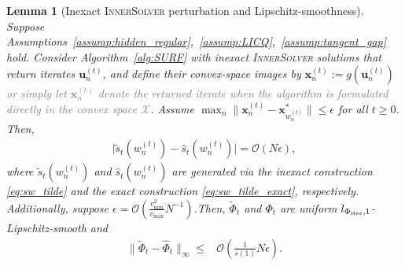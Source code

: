 \documentclass{article}
\newtheorem{lemma}{Lemma}
\newcommand{\Oc}{\mathcal{O}}
\newcommand{\bx}{\mathbf{x}}
\newcommand{\bu}{\mathbf{u}}
\newcommand{\X}{\mathcal{X}}
\newcommand{\Farc}{\Phi}
\begin{document}
\begin{lemma}[Inexact \textsc{InnerSolver} perturbation and Lipschitz-smoothness]
\label{lem:exact_inexact_polyline_sampled_weights_gap}
Suppose Assumptions~\ref{assump:hidden_regular},~\ref{assump:LICQ},~\ref{assump:tangent_gap} hold. Consider Algorithm~\ref{alg:SURF} with inexact \textsc{InnerSolver} solutions that return iterates $\bu_n^{(t)}$, and define their convex-space images by $\bx_n^{(t)}:=g(\bu_n^{(t)})$ \textcolor{gray}{or simply let $\bx_n^{(t)}$ denote the returned iterate when the algorithm is formulated directly in the convex space $\X$}. Assume $\max_n\|\bx_n^{(t)}-\bx_{w_n^{(t)}}^*\|\leq \epsilon$ for all $t\geq 0$. Then,
\begin{align}
\big|\tilde s_t(w_n^{(t)})-\hat s_t(w_n^{(t)})\big| = \Oc \left(N\epsilon\right), \label{eq:sampled_weights_gap_s_exact_inexact}
\end{align}
where $\tilde s_t(w_n^{(t)})$ and $\hat s_t(w_n^{(t)})$ are generated via the inexact construction \eqref{eq:sw_tilde} and the exact construction \eqref{eq:sw_tilde_exact}, respectively. 
Additionally, suppose $\epsilon= \Oc\left(\frac{v_{\min}^2}{v_{\max}}N^{-1}\right)$.Then, $\tilde\Farc_t$ and $\Farc_t$ are uniform $l_{\Farc_{\rm iter},1}$-Lipschitz-smooth and
\begin{align}
\|\tilde \Farc_t-\hat \Farc_t\|_\infty \le & \Oc\left( \frac{1}{s(1)} N \epsilon \right).
\label{eq:sup_gap_F_exact_inexact_final}
\end{align}
\end{lemma}
\end{document}
